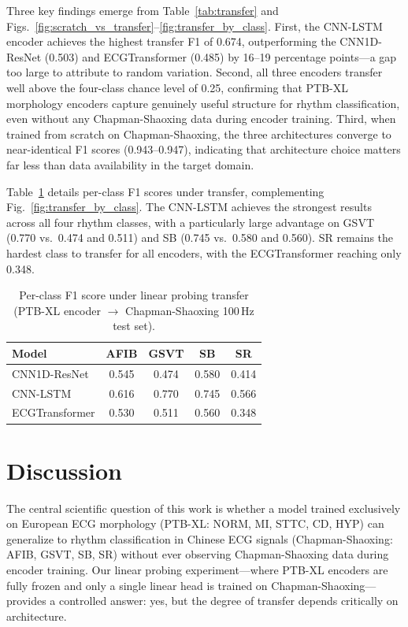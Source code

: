 \documentclass[journal]{IEEEtran}
\begin{document}
Three key findings emerge from Table~\ref{tab:transfer} and
Figs.~\ref{fig:scratch_vs_transfer}--\ref{fig:transfer_by_class}.
First, the CNN-LSTM encoder achieves the highest transfer F1 of 0.674,
outperforming the CNN1D-ResNet (0.503) and ECGTransformer (0.485) by
16--19 percentage points---a gap too large to attribute to random
variation. Second, all three encoders transfer well above the
four-class chance level of 0.25, confirming that PTB-XL morphology
encoders capture genuinely useful structure for rhythm classification,
even without any Chapman-Shaoxing data during encoder training. Third,
when trained from scratch on Chapman-Shaoxing, the three architectures
converge to near-identical F1 scores (0.943--0.947), indicating that
architecture choice matters far less than data availability in the
target domain.

Table~\ref{tab:transfer_per_class} details per-class F1 scores under
transfer, complementing Fig.~\ref{fig:transfer_by_class}. The CNN-LSTM
achieves the strongest results across all four rhythm classes, with a
particularly large advantage on GSVT (0.770 vs.\ 0.474 and 0.511) and
SB (0.745 vs.\ 0.580 and 0.560). SR remains the hardest class to
transfer for all encoders, with the ECGTransformer reaching only 0.348.

\begin{table}[t]
\caption{Per-class F1 score under linear probing transfer
(PTB-XL encoder $\to$ Chapman-Shaoxing 100\,Hz test set).}
\label{tab:transfer_per_class}
\centering
\begin{tabular}{lcccc}
\toprule
\textbf{Model} & \textbf{AFIB} & \textbf{GSVT} & \textbf{SB} & \textbf{SR} \\
\midrule
CNN1D-ResNet   & 0.545 & 0.474 & 0.580 & 0.414 \\
CNN-LSTM       & 0.616 & 0.770 & 0.745 & 0.566 \\
ECGTransformer & 0.530 & 0.511 & 0.560 & 0.348 \\
\bottomrule
\end{tabular}
\end{table}

\section{Discussion}

The central scientific question of this work is whether a model trained
exclusively on European ECG morphology (PTB-XL: NORM, MI, STTC, CD, HYP)
can generalize to rhythm classification in Chinese ECG signals
(Chapman-Shaoxing: AFIB, GSVT, SB, SR) without ever observing
Chapman-Shaoxing data during encoder training. Our linear probing
experiment---where PTB-XL encoders are fully frozen and only a single
linear head is trained on Chapman-Shaoxing---provides a controlled
answer: yes, but the degree of transfer depends critically on
architecture.
\end{document}

